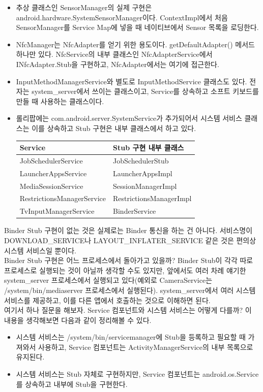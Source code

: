 \begin{itemize}
\item 추상 클래스인 SensorManager의 실제 구현은 android.hardware.SystemSensorManager이다. ContextImpl에서 처음 SensorManager를 Service Map에 넣을 때 네이티브에서 Sensor 목록을 로딩한다.

\item NfcManager는 NfcAdapter를 얻기 위한 용도이다.  getDefaultAdapter() 메서드 하나만 있다. NfcService의 내부 클래스인 NfcAdapterService에서 INfcAdapter.Stub을 구현하고, NfcAdapter에서는 여기에 접근한다.

\item InputMethodManagerService와 별도로 InputMethodService 클래스도 있다. 
전자는 system\_server에서 쓰이는 클래스이고, Service를 상속하고 소프트 키보드를 만들 때 사용하는 클래스이다.

\item 롤리팝에는 com.android.server.SystemService가 추가되어서 시스템 서비스  클래스는 이를 상속하고 Stub 구현은 내부 클래스에서 하고 있다.\\
\begin{tabular}[fontsize=\tiny]{|l|l|} \hline
Service & Stub 구현 내부 클래스 \\ \hline
JobSchedulerService & JobSchedulerStub \\ \hline
LauncherAppsService & LauncherAppsImpl \\ \hline
MediaSessionService & SessionManagerImpl \\ \hline
RestrictionsManagerService & RestrictionsManagerImpl \\ \hline
TvInputManagerService & BinderService \\ \hline
\end{tabular}
\end{itemize}

Binder Stub 구현이 없는 것은 실제로는 Binder 통신을 하는 건 아니다.
서비스명이 DOWNLOAD\_SERVICE나 LAYOUT\_INFLATER\_SERVICE 같은 것은 편의상 시스템 서비스일 뿐이다.\\

Binder Stub 구현은 어느 프로세스에서 돌아가고 있을까? Binder Stub이 각각 따로 프로세스로 실행되는 것이 아닐까 생각할 수도 있지만, 앞에서도 여러 차례 얘기한 system\_server 프로세스에서 실행되고 있다(예외로 CameraService는 /system/bin/mediaserver 프로세스에서 실행된다).			
system\_server에서 여러 시스템 서비스를 제공하고, 이를 다른 앱에서 호출하는 것으로 이해하면 된다.\\

여기서 하나 질문을 해보자. Service 컴포넌트와 시스템 서비스는 어떻게 다를까?
이 내용을 생각해보면 다음과 같이 정리해볼 수 있다.
\begin{itemize}
\item 시스템 서비스는 /system/bin/servicemanager에 Stub을 등록하고 필요할 때 가져와서 사용하고, Service 컴포넌트는 ActivityManagerService의 내부 목록으로 유지된다.
\item 시스템 서비스는 Stub 자체로 구현하지만, Service 컴포넌트는 android.os.Service를 상속하고 내부에 Stub을 구현한다.
\end{itemize}

